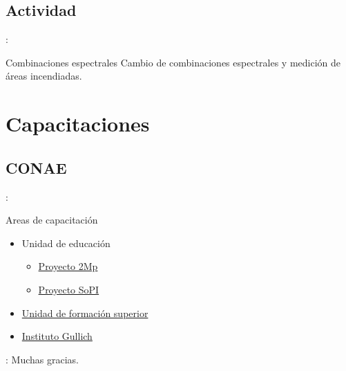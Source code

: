 \documentclass[handout,aspectratio=169]{beamer}
\begin{document}
\subsection{Actividad}

\begin{frame}{\secname : \subsecname}
    \begin{alertblock}{Combinaciones espectrales}
        Cambio de combinaciones espectrales y medición de áreas incendiadas.
    \end{alertblock}
\end{frame}

\section{Capacitaciones}
\subsection{CONAE}
\begin{frame}{\secname : \subsecname}
    \begin{block}{Areas de capacitación}
    \begin{itemize}
        \item Unidad de educación
        \begin{itemize}
            \item \href{https://2mp.conae.gov.ar}{Proyecto 2Mp}
            \item \href{https://sopi.conae.gov.ar}{Proyecto SoPI}
        \end{itemize}
        \item \href{http://ufs.conae.gov.ar/}{Unidad de formación superior}
        \item \href{http://ig.edu.ar/}{Instituto Gullich}
    \end{itemize}
    \end{block}
\end{frame}

\begin{frame}{\secname : \subsecname}
    Muchas gracias.
\end{frame}
\end{document}
